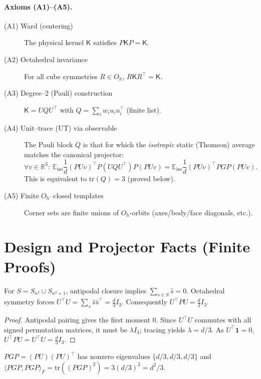\paragraph{Axioms (A1)–(A5).}
\begin{description}
\item[(A1) Ward (centering)] The physical kernel \(\mathsf{K}\) satisfies \(P\mathsf{K}P=\mathsf{K}\).
\item[(A2) Octahedral invariance] For all cube symmetries \(R\in O_h\), \(R\mathsf{K}R^\top=\mathsf{K}\).
\item[(A3) Degree–2 (Pauli) construction] \(\mathsf{K}=U Q U^\top\) with \(Q=\sum_i w_i u_i u_i^\top\) (finite list).
\item[(A4) Unit–trace (UT) via observable] The Pauli block \(Q\) is that for which the \emph{isotropic} static (Thomson) average matches the canonical projector:
\[
\forall v\in\mathbb{R}^3:\ \mathbb{E}_{\mathrm{iso}}\frac{1}{d}(PUv)^\top P(UQU^\top)P(PUv)
= \mathbb{E}_{\mathrm{iso}}\frac{1}{d}(PUv)^\top PGP(PUv).
\]
This is equivalent to \(\mathrm{tr}(Q)=3\) (proved below).
\item[(A5) Finite $O_h$–closed templates] Corner sets are finite unions of \(O_h\)-orbits (axes/body/face diagonals, etc.).
\end{description}

\section{Design and Projector Facts (Finite Proofs)}
\begin{lemma}
\label{lem:design}
For \(S=S_{n^2}\cup S_{n^2+1}\), antipodal closure implies \(\sum_{s\in S}\hat s=0\). Octahedral symmetry forces
\(
U^\top U=\sum_s \hat s\hat s^\top=\frac{d}{3}I_3
\).
Consequently \(U^\top P U=\frac{d}{3}I_3\).
\end{lemma}
\begin{proof}
Antipodal pairing gives the first moment \(0\).
Since \(U^\top U\) commutes with all signed permutation matrices, it must be \(\lambda I_3\); tracing yields \(\lambda=d/3\).
As \(U^\top \mathbf{1}=0\), \(U^\top P U=U^\top U=\frac{d}{3}I_3\).
\end{proof}

\begin{corollary}
\label{cor:spec}
\(PGP=(PU)(PU)^\top\) has nonzero eigenvalues \(\{d/3,d/3,d/3\}\) and
\(
\langle PGP,PGP\rangle_F=\mathrm{tr}((PGP)^2)=3(d/3)^2=d^2/3.
\)
\end{corollary}


